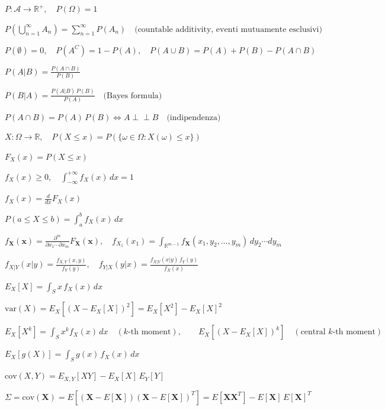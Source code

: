 \setlength{\parindent}{0pt}  %
\setlength{\parskip}{0.7em}  %


$P : \mathcal{A} \longrightarrow \mathbb{R}^+, \quad P(\Omega) = 1$

$P\!\left(\bigcup_{n=1}^{\infty} A_n\right) = \sum_{n=1}^{\infty} P(A_n) \quad \text{(countable additivity, eventi mutuamente esclusivi)}$

$P(\emptyset) = 0, \quad P(A^C) = 1 - P(A), \quad P(A \cup B) = P(A) + P(B) - P(A \cap B)$

$P(A|B) = \frac{P(A \cap B)}{P(B)}$

$P(B|A) = \frac{P(A|B)\,P(B)}{P(A)} \quad \text{(Bayes formula)}$

$P(A \cap B) = P(A)\,P(B) \iff A \perp\!\!\!\perp B \quad \text{(indipendenza)}$

$X : \Omega \longrightarrow \mathbb{R}, \quad P(X \leq x) = P\!\left(\{\omega \in \Omega : X(\omega) \leq x\}\right)$

$F_X(x) = P(X \leq x)$

$f_X(x) \geq 0, \quad \int_{-\infty}^{+\infty} f_X(x)\,dx = 1$

$f_X(x) = \frac{d}{dx}F_X(x)$

$P(a \leq X \leq b) = \int_a^b f_X(x)\,dx$

$f_{\mathbf{X}}(\mathbf{x}) = \frac{\partial^m}{\partial x_1 \cdots \partial x_m}F_{\mathbf{X}}(\mathbf{x}), \quad f_{X_1}(x_1) = \int_{\mathbb{R}^{m-1}} f_{\mathbf{X}}(x_1, y_2, \ldots, y_m)\,dy_2\cdots dy_m$

$f_{X|Y}(x|y) = \frac{f_{X,Y}(x,y)}{f_Y(y)}, \quad f_{Y|X}(y|x) = \frac{f_{X|Y}(x|y)\,f_Y(y)}{f_X(x)}$

$E_X[X] = \int_S x\, f_X(x)\,dx$

$\text{var}(X) = E_X\!\left[(X - E_X[X])^2\right] = E_X[X^2] - E_X[X]^2$

$E_X\!\left[X^k\right] = \int_S x^k f_X(x)\,dx \quad (k\text{-th moment}), \qquad E_X\!\left[(X - E_X[X])^k\right] \quad (\text{central } k\text{-th moment})$

$E_X[g(X)] = \int_S g(x)\, f_X(x)\,dx$

$\text{cov}(X, Y) = E_{X,Y}[XY] - E_X[X] \,E_Y[Y]$

$\Sigma = \text{cov}(\mathbf{X}) = E\!\left[(\mathbf{X} - E[\mathbf{X}])(\mathbf{X} - E[\mathbf{X}])^T\right] = E\!\left[\mathbf{X}\mathbf{X}^T\right] - E[\mathbf{X}]\,E[\mathbf{X}]^T$

